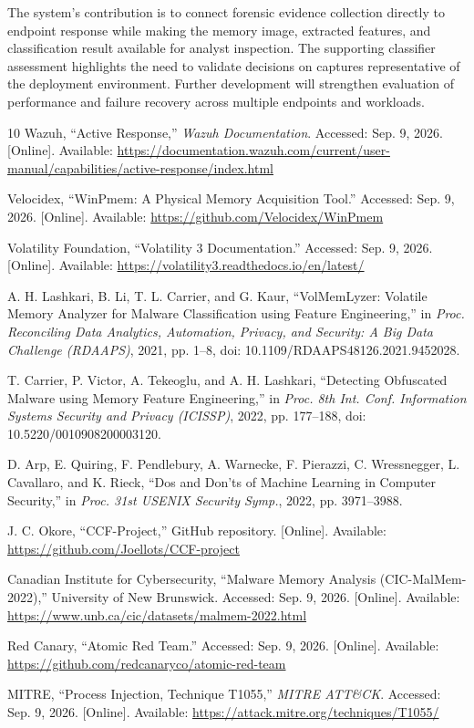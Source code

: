 \documentclass[conference]{IEEEtran}
\begin{document}
The system's contribution is to connect forensic evidence collection directly to endpoint response while making the memory image, extracted features, and classification result available for analyst inspection. The supporting
classifier assessment highlights the need to validate decisions on captures representative of the deployment environment. Further development will strengthen evaluation of performance and failure recovery across multiple endpoints and workloads.
\newpage
\begin{thebibliography}{10}
 Wazuh, ``Active Response,'' \textit{Wazuh Documentation}.
Accessed: Sep. 9, 2026. [Online]. Available:
\url{https://documentation.wazuh.com/current/user-manual/capabilities/active-response/index.html}

 Velocidex, ``WinPmem: A Physical Memory Acquisition Tool.''
Accessed: Sep. 9, 2026. [Online]. Available:
\url{https://github.com/Velocidex/WinPmem}

 Volatility Foundation, ``Volatility 3 Documentation.''
Accessed: Sep. 9, 2026. [Online]. Available:
\url{https://volatility3.readthedocs.io/en/latest/}

 A. H. Lashkari, B. Li, T. L. Carrier, and G. Kaur,
``VolMemLyzer: Volatile Memory Analyzer for Malware Classification using
Feature Engineering,'' in \textit{Proc. Reconciling Data Analytics,
Automation, Privacy, and Security: A Big Data Challenge (RDAAPS)},
2021, pp. 1--8, doi: 10.1109/RDAAPS48126.2021.9452028.

 T. Carrier, P. Victor, A. Tekeoglu, and A. H. Lashkari,
``Detecting Obfuscated Malware using Memory Feature Engineering,'' in
\textit{Proc. 8th Int. Conf. Information Systems Security and Privacy
(ICISSP)}, 2022, pp. 177--188, doi: 10.5220/0010908200003120.

 D. Arp, E. Quiring, F. Pendlebury, A. Warnecke,
F. Pierazzi, C. Wressnegger, L. Cavallaro, and K. Rieck,
``Dos and Don'ts of Machine Learning in Computer Security,'' in
\textit{Proc. 31st USENIX Security Symp.}, 2022, pp. 3971--3988.

 J. C. Okore, ``CCF-Project,'' GitHub repository.
[Online]. Available:
\url{https://github.com/Joellots/CCF-project}

 Canadian Institute for Cybersecurity,
``Malware Memory Analysis (CIC-MalMem-2022),'' University of New Brunswick.
Accessed: Sep. 9, 2026. [Online]. Available:
\url{https://www.unb.ca/cic/datasets/malmem-2022.html}

 Red Canary, ``Atomic Red Team.''
Accessed: Sep. 9, 2026. [Online]. Available:
\url{https://github.com/redcanaryco/atomic-red-team}

 MITRE, ``Process Injection, Technique T1055,''
\textit{MITRE ATT\&CK}.
Accessed: Sep. 9, 2026. [Online]. Available:
\url{https://attack.mitre.org/techniques/T1055/}

\end{thebibliography}
\end{document}
